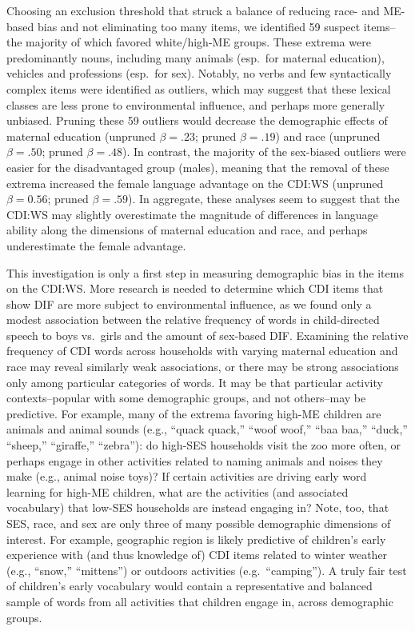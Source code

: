 \documentclass[10pt, letterpaper]{article}
\begin{document}
Choosing an exclusion threshold that struck a balance of reducing race-
and ME-based bias and not eliminating too many items, we identified 59
suspect items--the majority of which favored white/high-ME groups. These
extrema were predominantly nouns, including many animals (esp.~for
maternal education), vehicles and professions (esp.~for sex). Notably,
no verbs and few syntactically complex items were identified as
outliers, which may suggest that these lexical classes are less prone to
environmental influence, and perhaps more generally unbiased. Pruning
these 59 outliers would decrease the demographic effects of maternal
education (unpruned \(\beta=.23\); pruned \(\beta=.19\)) and race
(unpruned \(\beta=.50\); pruned \(\beta=.48\)). In contrast, the
majority of the sex-biased outliers were easier for the disadvantaged
group (males), meaning that the removal of these extrema increased the
female language advantage on the CDI:WS (unpruned \(\beta=0.56\); pruned
\(\beta=.59\)). In aggregate, these analyses seem to suggest that the
CDI:WS may slightly overestimate the magnitude of differences in
language ability along the dimensions of maternal education and race,
and perhaps underestimate the female advantage.

This investigation is only a first step in measuring demographic bias in
the items on the CDI:WS. More research is needed to determine which CDI
items that show DIF are more subject to environmental influence, as we
found only a modest association between the relative frequency of words
in child-directed speech to boys vs.~girls and the amount of sex-based
DIF. Examining the relative frequency of CDI words across households
with varying maternal education and race may reveal similarly weak
associations, or there may be strong associations only among particular
categories of words. It may be that particular activity
contexts--popular with some demographic groups, and not others--may be
predictive. For example, many of the extrema favoring high-ME children
are animals and animal sounds (e.g., ``quack quack,'' ``woof woof,''
``baa baa,'' ``duck,'' ``sheep,'' ``giraffe,'' ``zebra''): do high-SES
households visit the zoo more often, or perhaps engage in other
activities related to naming animals and noises they make (e.g., animal
noise toys)? If certain activities are driving early word learning for
high-ME children, what are the activities (and associated vocabulary)
that low-SES households are instead engaging in? Note, too, that SES,
race, and sex are only three of many possible demographic dimensions of
interest. For example, geographic region is likely predictive of
children's early experience with (and thus knowledge of) CDI items
related to winter weather (e.g., ``snow,'' ``mittens'') or outdoors
activities (e.g.~``camping''). A truly fair test of children's early
vocabulary would contain a representative and balanced sample of words
from all activities that children engage in, across demographic groups.
\end{document}
